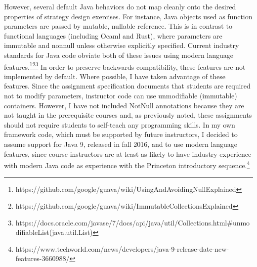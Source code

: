 \documentclass[pageno]{jpaper}
\begin{document}
However, several default Java behaviors do not map cleanly onto the desired properties of strategy design exercises.
For instance, Java objects used as function parameters are passed by mutable, nullable reference.
This is in contrast to functional languages (including Ocaml and Rust), where parameters are immutable and nonnull unless otherwise explicitly specified.
Current industry standards for Java code obviate both of these issues using modern language features.\footnote{https://github.com/google/guava/wiki/UsingAndAvoidingNullExplained}\footnote{https://github.com/google/guava/wiki/ImmutableCollectionsExplained}\footnote{https://docs.oracle.com/javase/7/docs/api/java/util/Collections.html\#unmodifiableList(java.util.List)}
In order to preserve backwards compatibility, these features are not implemented by default.
Where possible, I have taken advantage of these features.
Since the assignment specification documents that students are required not to modify parameters, instructor code can use unmodifiable (immutable) containers.
However, I have not included NotNull annotations because they are not taught in the prerequisite courses and, as previously noted, these assignments should not require students to self-teach any programming skills.
In my own framework code, which must be supported by future instructors, I decided to assume support for Java 9, released in fall 2016, and to use modern language features, since course instructors are at least as likely to have industry experience with modern Java code as experience with the Princeton introductory sequence.\footnote{https://www.techworld.com/news/developers/java-9-release-date-new-features-3660988/}
\end{document}
